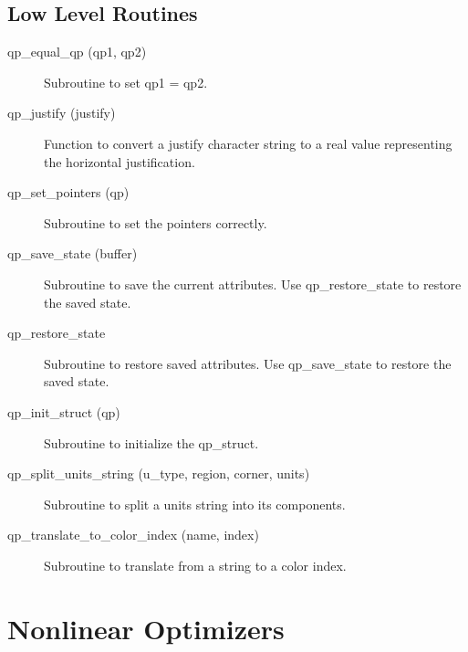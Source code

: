 \subsection{Low Level Routines}

\begin{description}

\item[qp\_equal\_qp (qp1, qp2)] \Newline 
     Subroutine to set qp1 = qp2.

\item[qp\_justify (justify)] \Newline 
     Function to convert a justify character string to a real value
     representing the horizontal justification. 

\item[qp\_set\_pointers (qp)] \Newline 
     Subroutine to set the pointers correctly.

\item[qp\_save\_state (buffer)] \Newline 
     Subroutine to save the current attributes. 
     Use qp\_restore\_state to restore the saved state.

\item[qp\_restore\_state] \Newline 
     Subroutine to restore saved attributes. 
     Use qp\_save\_state to restore the saved state.

\item[qp\_init\_struct (qp)] \Newline 
     Subroutine to initialize the qp\_struct.

\item[qp\_split\_units\_string (u\_type, region, corner, units)] \Newline 
     Subroutine to split a units string into its components.

\item[qp\_translate\_to\_color\_index (name, index)] \Newline 
     Subroutine to translate from a string to a color index.

\end{description}

\section{Nonlinear Optimizers}
\label{r:opti}      

